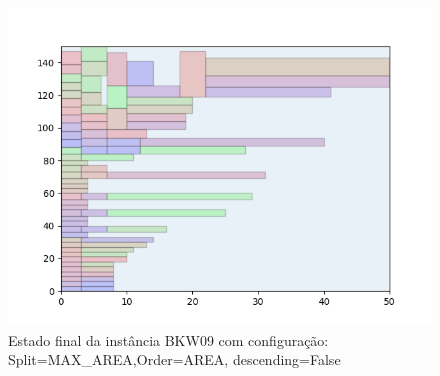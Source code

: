 \begin{figure}[H]
    \centering
    \caption[]{Estado final da instância BKW09 com configuração: Split=MAX_AREA,Order=AREA, descending=False}
    \label{fig:bkw09-max_area-area-false}
    \includegraphics[scale=0.5]{output/figures/bkw/bkw09/max_area/area/false/000}
\end{figure}